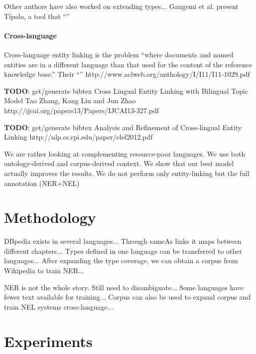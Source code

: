 \documentclass[10pt,a4paper]{article}
\newcommand{\todo}[1]{{\color{red}\textsf{\textbf{TODO}}: #1}}
\newcommand{\copypaste}[1]{``{\color{gray}{#1}}''}
\begin{document}
Other authors have also worked on extending types...
Gangemi et al. present T\'{ipalo}, a tool that \copypaste{identifies the most appropriate types for an entity by interpreting its natural language definition, which is extracted from its corresponding Wikipedia page abstract.} \cite{iswc12gangemi}


\paragraph{Cross-language}
Cross-language entity linking is the problem ``where documents and named entities are in a different language than that used for the content of the reference knowledge base.''
Their \copypaste{best model achieves performance which is 94\% of a strong monolingual baseline.}
http://www.aclweb.org/anthology/I/I11/I11-1029.pdf

\todo{get/generate bibtex}
Cross Lingual Entity Linking with Bilingual Topic Model
Tao Zhang, Kang Liu and Jun Zhao
http://ijcai.org/papers13/Papers/IJCAI13-327.pdf

\todo{get/generate bibtex}
Analysis and Refinement of Cross-lingual Entity Linking
http://nlp.cs.rpi.edu/paper/clef2012.pdf

We are rather looking at complementing resource-poor languages. 
We use both ontology-derived and corpus-derived context.
We show that our best model actually improves the results.
We do not perform only entity-linking but the full annotation (NER+NEL)

\section{Methodology}

DBpedia exists in several languages...
Through sameAs links it maps between different chapters...
Types defined in one language can be transferred to other languages...
After expanding the type coverage, we can obtain a corpus from Wikipedia to train NER...

NER is not the whole story. Still need to disambiguate...
Some languages have fewer text available for training...
Corpus can also be used to expand corpus and train NEL systems cross-language...

\section{Experiments}
\end{document}
